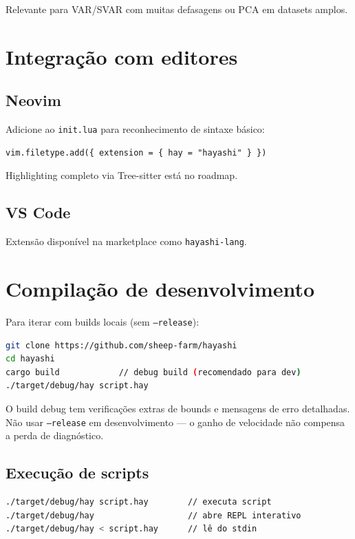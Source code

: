 Relevante para VAR/SVAR com muitas defasagens ou PCA em datasets amplos.

\section{Integração com editores}

\subsection*{Neovim}

Adicione ao \texttt{init.lua} para reconhecimento de sintaxe básico:

\begin{lstlisting}[style=inline, language=Hayashi]
vim.filetype.add({ extension = { hay = "hayashi" } })
\end{lstlisting}

Highlighting completo via Tree-sitter está no roadmap.

\subsection*{VS Code}

Extensão disponível na marketplace como \texttt{hayashi-lang}.

\section{Compilação de desenvolvimento}

Para iterar com builds locais (sem \texttt{--release}):

\begin{lstlisting}[style=inline, language=sh]
git clone https://github.com/sheep-farm/hayashi
cd hayashi
cargo build            // debug build (recomendado para dev)
./target/debug/hay script.hay
\end{lstlisting}

O build debug tem verificações extras de bounds e mensagens de erro detalhadas.
Não usar \texttt{--release} em desenvolvimento — o ganho de velocidade não
compensa a perda de diagnóstico.

\subsection*{Execução de scripts}

\begin{lstlisting}[style=inline, language=sh]
./target/debug/hay script.hay        // executa script
./target/debug/hay                   // abre REPL interativo
./target/debug/hay < script.hay      // lê do stdin
\end{lstlisting}
